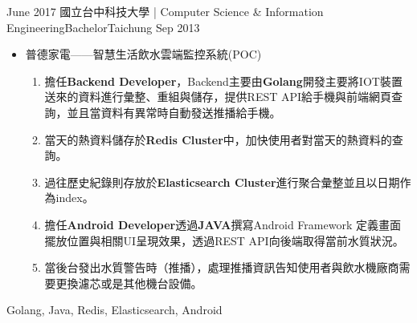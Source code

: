 \begin{experiences}
  \experience
    {June 2017}   {國立台中科技大學 | Computer Science \& Information Engineering}{Bachelor}{Taichung}
    {Sep 2013} {
                       \begin{itemize}
                        \item 普德家電——智慧生活飲水雲端監控系統(POC)
                        \begin{enumerate}
                        	\item 擔任\textbf{Backend Developer}，Backend主要由\textbf{Golang}開發主要將IOT裝置送來的資料進行彙整、重組與儲存，提供REST API給手機與前端網頁查詢，並且當資料有異常時自動發送推播給手機。
                    	    \item 當天的熱資料儲存於\textbf{Redis Cluster}中，加快使用者對當天的熱資料的查詢。
                    	    \item 過往歷史紀錄則存放於\textbf{Elasticsearch Cluster}進行聚合彙整並且以日期作為index。
                        	\item 擔任\textbf{Android Developer}透過\textbf{JAVA}撰寫Android Framework 定義畫面擺放位置與相關UI呈現效果，透過REST API向後端取得當前水質狀況。
                        	\item 當後台發出水質警告時（推播），處理推播資訊告知使用者與飲水機廠商需要更換濾芯或是其他機台設備。
                        \end{enumerate}
                      \end{itemize}
                    }
       {Golang, Java, Redis, Elasticsearch, Android}
\emptySeparator
\end{experiences}